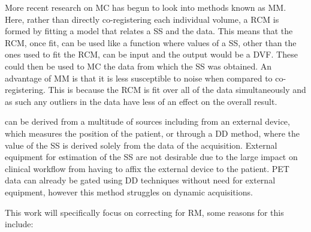         More recent research on \gls{MC} has begun to look into methods known as \gls{MM}. Here, rather than directly co-registering each individual volume, a \gls{RCM} is formed by fitting a model that relates a \gls{SS} and the data. This means that the \gls{RCM}, once fit, can be used like a function where values of a \gls{SS}, other than the ones used to fit the \gls{RCM}, can be input and the output would be a \gls{DVF}. These  could then be used to \gls{MC} the data from which the \gls{SS} was obtained. An advantage of \gls{MM} is that it is less susceptible to noise when compared to co-registering. This is because the \gls{RCM} is fit over all of the data simultaneously and as such any outliers in the data have less of an effect on the overall result.
    
         can be derived from a multitude of sources including from an external device, which measures the position of the patient, or through a \gls{DD} method, where the value of the \gls{SS} is derived solely from the data of the acquisition. External equipment for estimation of the \gls{SS} are not desirable due to the large impact on clinical workflow from having to affix the external device to the patient. \gls{PET} data can already be gated using \gls{DD} techniques without need for external equipment, however this method struggles on dynamic acquisitions.%
            
        This work will specifically focus on correcting for \gls{RM}, some reasons for this include:
            

